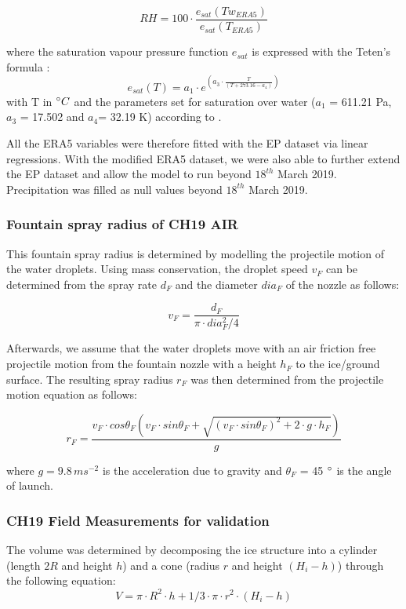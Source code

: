\documentclass[utf8]{frontiersSCNS} %
\begin{document}
\begin{equation} RH = 100 \cdot
    \frac{e_{sat}(Tw_{ERA5})}{e_{sat}(T_{ERA5})} \end{equation} 

where the saturation vapour pressure function $e_{sat}$ is expressed with the Teten's formula \citep{Tetens}:
\begin{equation} e_{sat}(T)= a_1 \cdot e^{(a_3 \cdot \frac{T}{(T+273.16-a_4)})} \end{equation} with T in $\degree C$ and
the parameters set for saturation over water ($a_1$ = 611.21 Pa, $a_3$ = 17.502 and $a_4$= 32.19 K) according to
\cite{Buck_1981}.    

All the ERA5 variables were therefore fitted with the EP dataset via linear regressions.  With the modified ERA5
dataset, we were also able to further extend the EP dataset and allow the model to run beyond $18^{th}$ March 2019.
Precipitation was filled as null values beyond $18^{th}$ March 2019.

\subsubsection{Fountain spray radius of CH19 AIR} \label{section:sprayCH19} 
This fountain spray radius is determined by modelling the projectile motion of the water droplets. Using mass
conservation, the droplet speed $v_F$ can be determined from the spray rate $d_F$ and the diameter $dia_F$ of the nozzle
as follows:

\begin{equation} v_F = \frac{d_F}{\pi \cdot dia_F^2/4} \end{equation}

Afterwards, we assume that the water droplets move with an air friction free projectile motion from the fountain
nozzle with a height $h_F$ to the ice/ground surface. The resulting spray radius $r_F$ was then determined from the
projectile motion equation as follows:

\begin{equation} r_F = \frac{v_F \cdot cos\theta_F (v_F \cdot sin\theta_F + \sqrt{(v_F \cdot sin\theta_F)^{2} + 2
\cdot g \cdot h_F})}{g} \end{equation}

where $g = 9.8\, m s^{-2}$ is the acceleration due to gravity and $\theta_F$ = 45 $\degree$ is the angle of launch.

\subsubsection{CH19 Field Measurements for validation} \label{section:validation} 
The volume was determined by decomposing the ice structure into a cylinder (length $2R$ and height $h$) and a
cone (radius $r$ and height $(H_i-h)$) through the following equation: 
\begin{equation} V = \pi \cdot R^2 \cdot h + 1/3 \cdot \pi \cdot r^2 \cdot (H_i-h) \end{equation}
\end{document}
